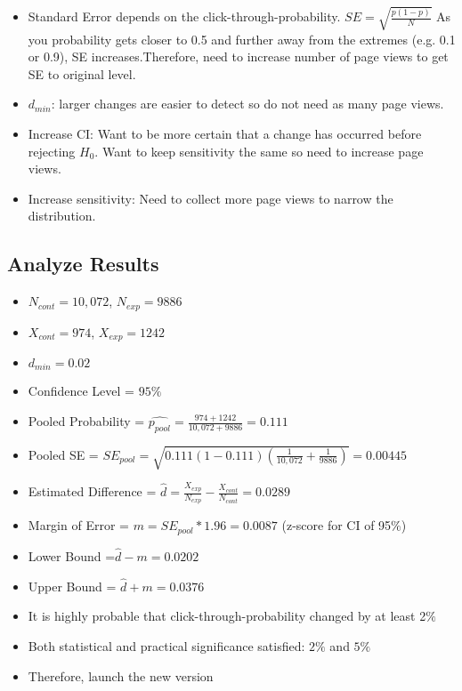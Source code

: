 \documentclass[10pt]{article}
\theoremstyle{definition}
\begin{document}
\begin{itemize}
    \item Standard Error depends on the click-through-probability.
    $SE = \sqrt{\frac{p(1-p)}{N}}$
    As you probability gets closer to 0.5 and further away from the extremes (e.g. 0.1 or 0.9), SE increases.Therefore, need to increase number of page views to get SE to original level.
    \item $d_{min}$: larger changes are easier to detect so do not need as many page views.
    \item Increase CI: Want to be more certain that a change has occurred before rejecting $H_{0}$. Want to keep sensitivity the same so need to increase page views.
    \item Increase sensitivity: Need to collect more page views to narrow the distribution.
\end{itemize}

\subsection{Analyze Results}

\begin{itemize}
    \item $N_{cont} = 10,072$, $N_{exp} = 9886$
    \item $X_{cont} = 974$, $X_{exp} = 1242$
    \item $d_{min} = 0.02$
    \item Confidence Level = $95\%$
    \item Pooled Probability = $\hat{p_{pool}} = \frac{974+1242}{10,072+9886} = 0.111$
    \item Pooled SE = $SE_{pool} = \sqrt{0.111(1-0.111)(\frac{1}{10,072} + \frac{1}{9886})} = 0.00445$
    \item Estimated Difference = $\hat{d} = \frac{X_{exp}}{N_{exp}} - \frac{X_{cont}}{N_{cont}} = 0.0289$
    \item Margin of Error = $m =SE_{pool}*1.96=0.0087$ (z-score for CI of 95$\%$)
    \item Lower Bound =$\hat{d} - m = 0.0202$ 
    \item Upper Bound = $\hat{d} + m = 0.0376$
    \item It is highly probable that click-through-probability changed by at least 2$\%$
    \item Both statistical and practical significance satisfied: $2\%$ and $5\%$
    \item Therefore, launch the new version
\end{itemize}
\end{document}
